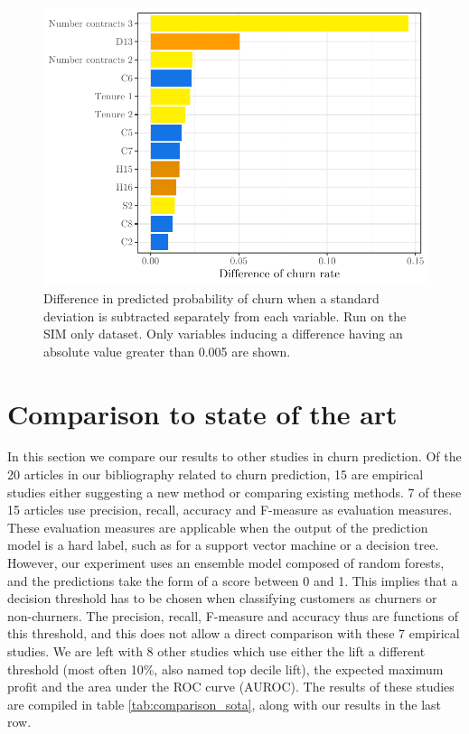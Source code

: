 \begin{figure}
    \centering
    \includegraphics[width=0.9\linewidth]{figures/offset_1m.pdf}
    \caption{Difference in predicted probability of churn when a standard
    deviation is subtracted separately from each variable. Run on the SIM only
    dataset. Only variables inducing a difference having an absolute value
    greater than 0.005 are shown.}
    \label{fig:offset_1m}
\end{figure}

\section{Comparison to state of the art}

In this section we compare our results to other studies in churn prediction. Of
the 20 articles in our bibliography related to churn prediction, 15 are
empirical studies either suggesting a new method or comparing existing methods.
7 of these 15 articles use precision, recall, accuracy and F-measure as
evaluation measures. These evaluation measures are applicable when the output of
the prediction model is a hard label, such as for a support vector machine or a
decision tree. However, our experiment uses an ensemble model composed of random
forests, and the predictions take the form of a score between 0 and 1. This
implies that a decision threshold has to be chosen when classifying customers as
churners or non-churners. The precision, recall, F-measure and accuracy thus are
functions of this threshold, and this does not allow a direct comparison with
these 7 empirical studies. We are left with 8 other studies which use either the
lift a different threshold (most often 10\%, also named top decile lift), the
expected maximum profit and the area under the ROC curve (AUROC). The results of
these studies are compiled in table \ref{tab:comparison_sota}, along with our
results in the last row.

